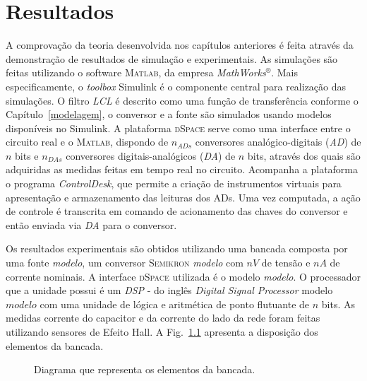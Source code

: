 
\chapter{Resultados}\label{resultados}

  A comprovação da teoria desenvolvida nos capítulos anteriores é feita através da demonstração de resultados de simulação e experimentais. As simulações são feitas utilizando o software \textsc{Matlab}, da empresa \textit{MathWorks}$^\circledR$. Mais especificamente, o \textit{toolbox} Simulink é o componente central para realização das simulações. O filtro \textit{LCL} é descrito como uma função de transferência conforme o Capítulo~\ref{modelagem}, o conversor e a fonte são simulados usando modelos disponíveis no Simulink. A plataforma \textsc{dSpace} serve como uma interface entre o circuito real e o \textsc{Matlab}, dispondo de $n_{ADs}$ conversores analógico-digitais (\emph{AD}) de $n$ bits e $n_{DAs}$ conversores digitais-analógicos (\emph{DA}) de $n$ bits, através dos quais são adquiridas as medidas feitas em tempo real no circuito. Acompanha a plataforma o programa \emph{ControlDesk}, que permite a criação de instrumentos virtuais para apresentação e armazenamento das leituras dos ADs. Uma vez computada, a ação de controle é transcrita em comando de acionamento das chaves do conversor e então enviada via \emph{DA} para o conversor.

  Os resultados experimentais são obtidos utilizando uma bancada composta por uma fonte \textit{modelo}, um conversor \textsc{Semikron} \textit{modelo} com $n V$ de tensão e $n A$ de corrente nominais. A interface \textsc{dSpace} utilizada é o modelo \textit{modelo}. O processador que a unidade possui é um \emph{DSP} - do inglês \emph{Digital Signal Processor} modelo $modelo$ com uma unidade de lógica e aritmética de ponto flutuante de $n$ bits. As medidas corrente do capacitor e da corrente do lado da rede foram feitas utilizando sensores de Efeito Hall. A Fig.~\ref{fig:topologia_bancada} apresenta a disposição dos elementos da bancada.
  \begin{figure}[htb]
    \centering{
      \def\svgwidth{0.9\textwidth}
      }
    \renewcommand\figurename{Fig.}
    \caption{Diagrama que representa os elementos da bancada.}
    \label{fig:topologia_bancada}
  \end{figure}


